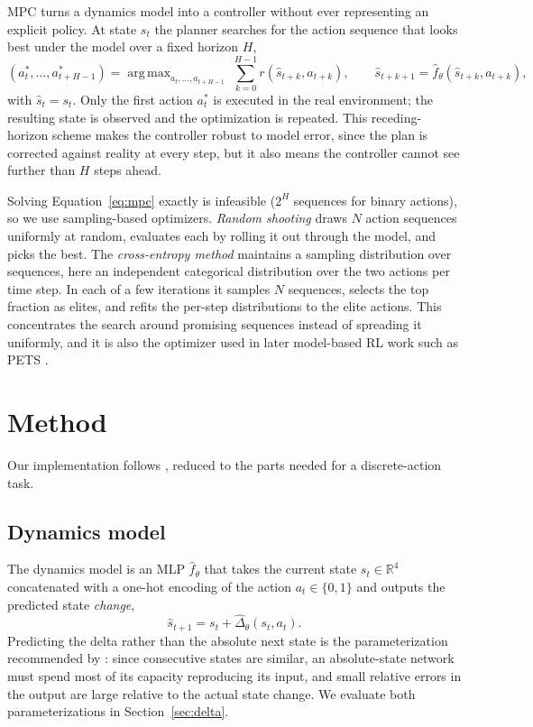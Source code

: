 \documentclass{article}
\DeclareMathOperator*{\argmax}{arg\,max}
\begin{document}
MPC turns a dynamics model into a controller without ever representing an explicit policy. At state $s_t$ the planner searches for the action sequence that looks best under the model over a fixed horizon $H$,
\begin{equation}
  (a_t^*, \dots, a_{t+H-1}^*) = \argmax_{a_t, \dots, a_{t+H-1}} \; \sum_{k=0}^{H-1} r(\hat{s}_{t+k}, a_{t+k}),
  \qquad \hat{s}_{t+k+1} = \hat{f}_\theta(\hat{s}_{t+k}, a_{t+k}),
  \label{eq:mpc}
\end{equation}
with $\hat{s}_t = s_t$. Only the first action $a_t^*$ is executed in the real environment; the resulting state is observed and the optimization is repeated. This receding-horizon scheme makes the controller robust to model error, since the plan is corrected against reality at every step, but it also means the controller cannot see further than $H$ steps ahead.

Solving Equation~\ref{eq:mpc} exactly is infeasible ($2^H$ sequences for binary actions), so we use sampling-based optimizers. \emph{Random shooting} \citep{richards2005, nagabandi2018} draws $N$ action sequences uniformly at random, evaluates each by rolling it out through the model, and picks the best. The \emph{cross-entropy method} \citep{rubinstein1999} maintains a sampling distribution over sequences, here an independent categorical distribution over the two actions per time step. In each of a few iterations it samples $N$ sequences, selects the top fraction as elites, and refits the per-step distributions to the elite actions. This concentrates the search around promising sequences instead of spreading it uniformly, and it is also the optimizer used in later model-based RL work such as PETS \citep{chua2018}.

\section{Method}

Our implementation follows \citet{nagabandi2018}, reduced to the parts needed for a discrete-action task.

\subsection{Dynamics model}

The dynamics model is an MLP $\hat{f}_\theta$ that takes the current state $s_t \in \mathbb{R}^4$ concatenated with a one-hot encoding of the action $a_t \in \{0, 1\}$ and outputs the predicted state \emph{change},
\begin{equation}
  \hat{s}_{t+1} = s_t + \hat{\Delta}_\theta(s_t, a_t).
\end{equation}
Predicting the delta rather than the absolute next state is the parameterization recommended by \citet{nagabandi2018}: since consecutive states are similar, an absolute-state network must spend most of its capacity reproducing its input, and small relative errors in the output are large relative to the actual state change. We evaluate both parameterizations in Section~\ref{sec:delta}.
\end{document}
